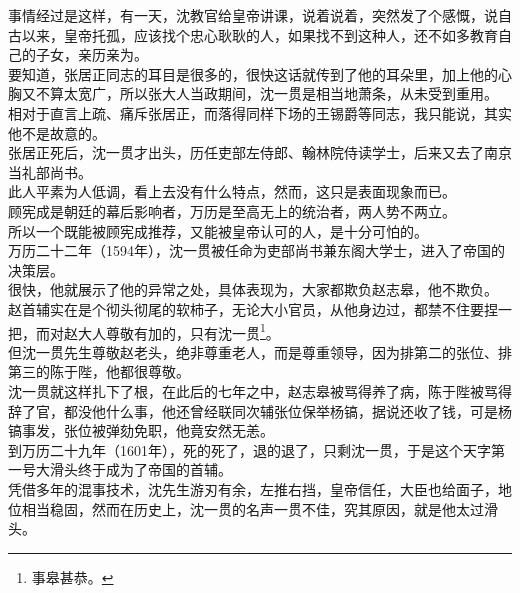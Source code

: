 \begin{multicols}{\theparacolNo}
事情经过是这样，有一天，沈教官给皇帝讲课，说着说着，突然发了个感慨，说自古以来，皇帝托孤，应该找个忠心耿耿的人，如果找不到这种人，还不如多教育自己的子女，亲历亲为。\\

要知道，张居正同志的耳目是很多的，很快这话就传到了他的耳朵里，加上他的心胸又不算太宽广，所以张大人当政期间，沈一贯是相当地萧条，从未受到重用。\\

相对于直言上疏、痛斥张居正，而落得同样下场的王锡爵等同志，我只能说，其实他不是故意的。\\

张居正死后，沈一贯才出头，历任吏部左侍郎、翰林院侍读学士，后来又去了南京当礼部尚书。\\

此人平素为人低调，看上去没有什么特点，然而，这只是表面现象而已。\\

顾宪成是朝廷的幕后影响者，万历是至高无上的统治者，两人势不两立。\\

所以一个既能被顾宪成推荐，又能被皇帝认可的人，是十分可怕的。\\

万历二十二年（1594年），沈一贯被任命为吏部尚书兼东阁大学士，进入了帝国的决策层。\\

很快，他就展示了他的异常之处，具体表现为，大家都欺负赵志皋，他不欺负。\\

赵首辅实在是个彻头彻尾的软柿子，无论大小官员，从他身边过，都禁不住要捏一把，而对赵大人尊敬有加的，只有沈一贯\footnote{事皋甚恭。}。\\

但沈一贯先生尊敬赵老头，绝非尊重老人，而是尊重领导，因为排第二的张位、排第三的陈于陛，他都很尊敬。\\

沈一贯就这样扎下了根，在此后的七年之中，赵志皋被骂得养了病，陈于陛被骂得辞了官，都没他什么事，他还曾经联同次辅张位保举杨镐，据说还收了钱，可是杨镐事发，张位被弹劾免职，他竟安然无恙。\\

到万历二十九年（1601年），死的死了，退的退了，只剩沈一贯，于是这个天字第一号大滑头终于成为了帝国的首辅。\\

凭借多年的混事技术，沈先生游刃有余，左推右挡，皇帝信任，大臣也给面子，地位相当稳固，然而在历史上，沈一贯的名声一贯不佳，究其原因，就是他太过滑头。\\


\end{multicols}
